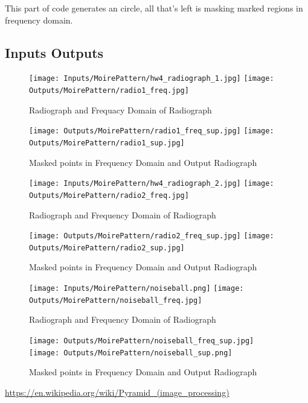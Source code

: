 \documentclass[12pt]{article}
\begin{document}
This part of code generates an circle, all that's left is masking marked regions in frequency domain.

\subsection{Inputs Outputs}

\begin{figure}[H]
\centering
\texttt{[image: Inputs/MoirePattern/hw4\_radiograph\_1.jpg]}
\texttt{[image: Outputs/MoirePattern/radio1\_freq.jpg]}
\caption{Radiograph and Frequacy Domain of Radiograph}

\texttt{[image: Outputs/MoirePattern/radio1\_freq\_sup.jpg]}
\texttt{[image: Outputs/MoirePattern/radio1\_sup.jpg]}
\caption{Masked points in Frequency Domain and Output Radiograph}

\end{figure}

\begin{figure}[H]
\centering
\texttt{[image: Inputs/MoirePattern/hw4\_radiograph\_2.jpg]}
\texttt{[image: Outputs/MoirePattern/radio2\_freq.jpg]}
\caption{Radiograph and Frequency Domain of Radiograph}

\texttt{[image: Outputs/MoirePattern/radio2\_freq\_sup.jpg]}
\texttt{[image: Outputs/MoirePattern/radio2\_sup.jpg]}
\caption{Masked points in Frequency Domain and Output Radiograph}

\end{figure}

\begin{figure}[H]
\centering
\texttt{[image: Inputs/MoirePattern/noiseball.png]}
\texttt{[image: Outputs/MoirePattern/noiseball\_freq.jpg]}
\caption{Radiograph and Frequency Domain of Radiograph}

\texttt{[image: Outputs/MoirePattern/noiseball\_freq\_sup.jpg]}
\texttt{[image: Outputs/MoirePattern/noiseball\_sup.png]}
\caption{Masked points in Frequency Domain and Output Radiograph}

\end{figure}



  \begin{thebibliography}{1}
   \url{https://en.wikipedia.org/wiki/Pyramid_(image_processing)}
  \end{thebibliography}             
\end{document}

